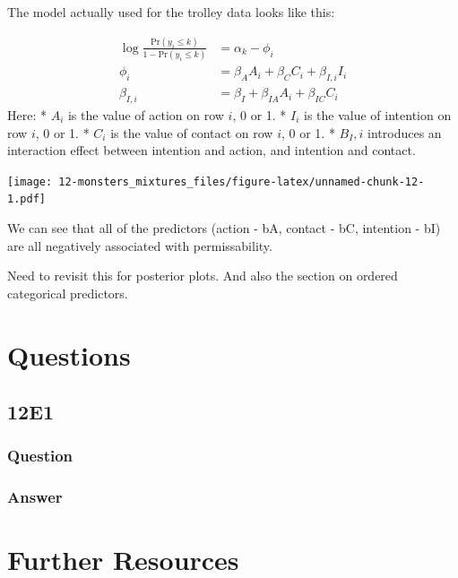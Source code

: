 \documentclass[
]{book}
\begin{document}
The model actually used for the trolley data looks like this:

\[
\begin{aligned}
\log\frac{\text{Pr}(y_i \leq k)}{1 - \text{Pr}(y_i \leq k)} &= \alpha_k - \phi_i \\
\phi_i & = \beta_A A_i + \beta_C C_i + \beta_{I,i} I_i \\
\beta_{I,i} &= \beta_I + \beta_{IA} A_i + \beta_{IC} C_i 
\end{aligned}
\]
Here:
* \(A_i\) is the value of action on row \(i\), 0 or 1.
* \(I_i\) is the value of intention on row \(i\), 0 or 1.
* \(C_i\) is the value of contact on row \(i\), 0 or 1.
* \(B_I,i\) introduces an interaction effect between intention and action, and intention and contact.

\texttt{[image: 12-monsters\_mixtures\_files/figure-latex/unnamed-chunk-12-1.pdf]}

We can see that all of the predictors (action - bA, contact - bC, intention - bI) are all negatively associated with permissability.

Need to revisit this for posterior plots. And also the section on ordered categorical predictors.

\hypertarget{questions-11}{%
\section{Questions}\label{questions-11}}

\hypertarget{e1-9}{%
\subsection*{12E1}\label{e1-9}}

\hypertarget{question-98}{%
\subsubsection*{Question}\label{question-98}}

\hypertarget{answer-98}{%
\subsubsection*{Answer}\label{answer-98}}

\hypertarget{further-resources-2}{%
\section*{Further Resources}\label{further-resources-2}}
\end{document}

